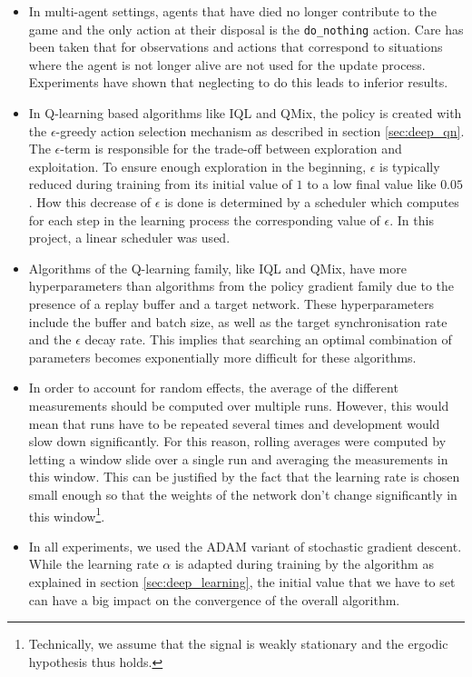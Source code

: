 \begin{itemize}
\begin{equation}
        \end{equation}
    \item In multi-agent settings, agents that have died no longer contribute to the game and the only action at their disposal is the {\tt do\_nothing} action. Care has been taken that for observations and actions that correspond to situations where the agent is not longer alive are not used for the update process. Experiments have shown that neglecting to do this leads to inferior results.
    \item In Q-learning based algorithms like IQL and QMix, the policy is created with the $\epsilon$-greedy action selection mechanism as described in section \ref{sec:deep_qn}. The $\epsilon$-term is responsible for the trade-off between exploration and exploitation. To ensure enough exploration in the beginning, $\epsilon$ is typically reduced during training from its initial value of $1$ to a low final value like $0.05$. How this decrease of $\epsilon$ is done is determined by a scheduler which computes for each step in the learning process the corresponding value of $\epsilon$. In this project, a linear scheduler was used.
    \item Algorithms of the Q-learning family, like IQL and QMix, have more hyperparameters than algorithms from the policy gradient family due to the presence of a replay buffer and a target network. These hyperparameters include the buffer and batch size, as well as the target synchronisation rate and the $\epsilon$ decay rate. This implies that searching an optimal combination of parameters becomes exponentially more difficult for these algorithms.
    \item In order to account for random effects, the average of the different measurements should be computed over multiple runs. However, this would mean that runs have to be repeated several times and development would slow down significantly. For this reason, rolling averages were computed by letting a window slide over a single run and averaging the measurements in this window. This can be justified by the fact that the learning rate is chosen small enough so that the weights of the network don't change significantly in this window\footnote{Technically, we assume that the signal is weakly stationary and the ergodic hypothesis thus holds.}.
    \item In all experiments, we used the ADAM variant of stochastic gradient descent. While the learning rate $\alpha$ is adapted during training by the algorithm as explained in section \ref{sec:deep_learning}, the initial value that we have to set can have a big impact on the convergence of the overall algorithm.
\end{itemize}

